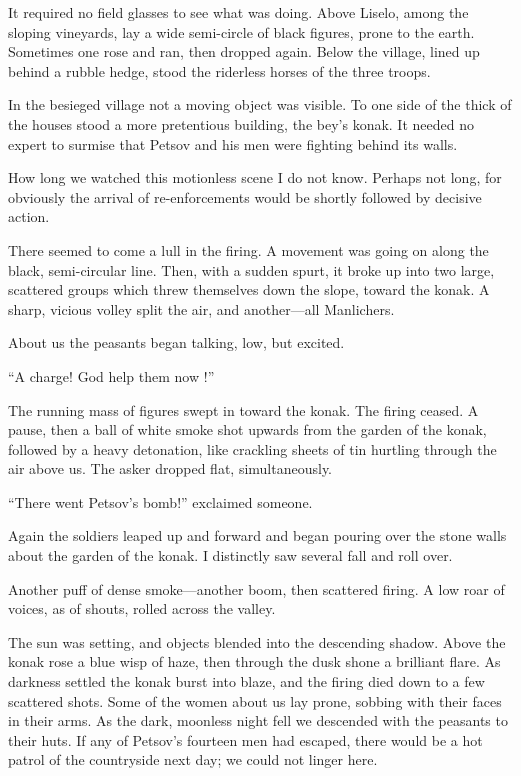 \documentclass[a5paper,12pt]{book}
\begin{document}
It required no field glasses to see what was doing. Above Liselo, among the sloping vineyards, lay a wide semi-circle of black figures, prone to the earth. Sometimes one rose and ran, then dropped again. Below the village, lined up behind a rubble hedge, stood the riderless horses of the three troops.

In the besieged village not a moving object was visible. To one side of the thick of the houses stood a more pretentious building, the bey's konak. It needed no expert to surmise that Petsov and his men were fighting behind its walls.

How long we watched this motionless scene I do not know. Perhaps not long, for obviously the arrival of re-enforcements would be shortly followed by decisive action.

There seemed to come a lull in the firing. A movement was going on along the black, semi-circular line. Then, with a sudden spurt, it broke up into two large, scattered groups which threw themselves down the slope, toward the konak. A sharp, vicious volley split the air, and another—all Manlichers.

About us the peasants began talking, low, but excited.

“A charge! God help them now !”

The running mass of figures swept in toward the konak. The firing ceased. A pause, then a ball of white smoke shot upwards from the garden of the konak, followed by a heavy detonation, like crackling sheets of tin hurtling through the air above us. The asker dropped flat, simultaneously.

“There went Petsov’s bomb!” exclaimed someone.

Again the soldiers leaped up and forward and began pouring over the stone walls about the garden of the konak. I distinctly saw several fall and roll over.

Another puff of dense smoke—another boom, then scattered firing. A low roar of voices, as of shouts, rolled across the valley.

The sun was setting, and objects blended into the descending shadow. Above the konak rose a blue wisp of haze, then through the dusk shone a brilliant flare. As darkness settled the konak burst into blaze, and the firing died down to a few scattered shots. Some of the women about us lay prone, sobbing with their faces in their arms. As the dark, moonless night fell we descended with the peasants to their huts. If any of Petsov’s fourteen men had escaped, there would be a hot patrol of the countryside next day; we could not linger here.
\end{document}
